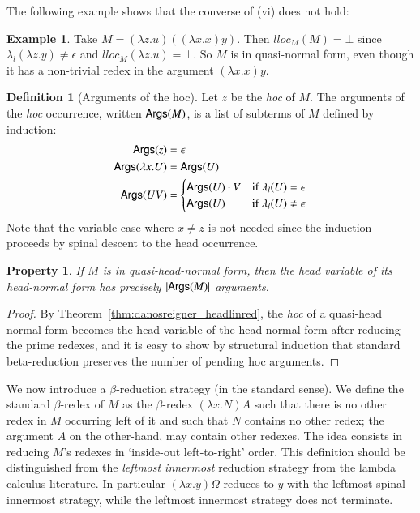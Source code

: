 \documentclass{elsarticle}
\theoremstyle{plain}
\newtheorem{property}[theorem]{Property}
\theoremstyle{definition}
\newtheorem{definition}{Definition}[section]
\newtheorem{example}{Example}[section]
\theoremstyle{remark}
\begin{document}
The following example shows that the converse of (vi) does not hold:
\begin{example}
Take $M= (\lambda z.u)((\lambda x . x) y)$. Then $lloc_M(M) = \bot$ since $\lambda_l(\lambda z.y)\ne\epsilon$ and $lloc_M(\lambda z.u) = \bot$.
So $M$ is in quasi-normal form, even though it has a non-trivial redex in the argument $(\lambda x . x) y$.
\end{example}

\begin{definition}[Arguments of the hoc]
Let $z$ be the \emph{hoc} of $M$. The arguments of the \emph{hoc} occurrence, written ${\sf Args}(M)$, is a list of subterms of $M$ defined by induction:
\begin{align*}
{\sf Args}(z) &= \epsilon \\
{\sf Args}(\lambda x . U ) &= {\sf Args}(U) \\
{\sf Args}(U V) &= \begin{cases}
             {\sf Args}(U) \cdot V & \mbox{if } \lambda_l(U) = \epsilon\\
             {\sf Args}(U)         & \mbox{if } \lambda_l(U) \neq \epsilon
            \end{cases}
\end{align*}
Note that the variable case where $x\neq z$ is not needed since the induction proceeds by spinal descent to the head occurrence.
\end{definition}

\begin{property}
\label{property:hoc_argument_count_in_headnf}
    If $M$ is in quasi-head-normal form, then the head variable of its head-normal form has precisely $|{\sf Args}(M)|$ arguments.
\end{property}
\begin{proof}
By Theorem~\ref{thm:danosreigner_headlinred}, the \emph{hoc} of a quasi-head normal form becomes the head variable of the head-normal form after reducing the prime redexes, and it is easy to show by structural induction that standard beta-reduction preserves the number of pending hoc arguments.
\end{proof}

We now introduce a $\beta$-reduction strategy (in the standard sense).
We define the  standard $\beta$-redex of $M$ as the $\beta$-redex $(\lambda x . N) A$ such that there is no other redex in $M$ occurring left of it and such that $N$ contains no other redex; the argument $A$ on the other-hand, may contain other redexes.
The idea consists in reducing $M$'s redexes in `inside-out left-to-right' order.
This definition should be distinguished from the \emph{leftmost innermost} reduction strategy from the lambda calculus literature.
In particular $(\lambda x . y) \Omega$ reduces to $y$ with the leftmost spinal-innermost strategy, while the leftmost innermost strategy does not terminate.
\end{document}
